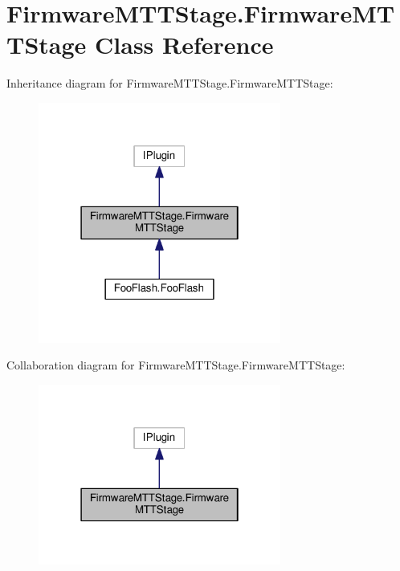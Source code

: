 \hypertarget{classFirmwareMTTStage_1_1FirmwareMTTStage}{\section{Firmware\-M\-T\-T\-Stage.\-Firmware\-M\-T\-T\-Stage Class Reference}
\label{classFirmwareMTTStage_1_1FirmwareMTTStage}
}


Inheritance diagram for Firmware\-M\-T\-T\-Stage.\-Firmware\-M\-T\-T\-Stage\-:
\nopagebreak
\begin{figure}[H]
\begin{center}
\leavevmode
\includegraphics[width=226pt]{classFirmwareMTTStage_1_1FirmwareMTTStage__inherit__graph}
\end{center}
\end{figure}


Collaboration diagram for Firmware\-M\-T\-T\-Stage.\-Firmware\-M\-T\-T\-Stage\-:
\nopagebreak
\begin{figure}[H]
\begin{center}
\leavevmode
\includegraphics[width=226pt]{classFirmwareMTTStage_1_1FirmwareMTTStage__coll__graph}
\end{center}
\end{figure}
